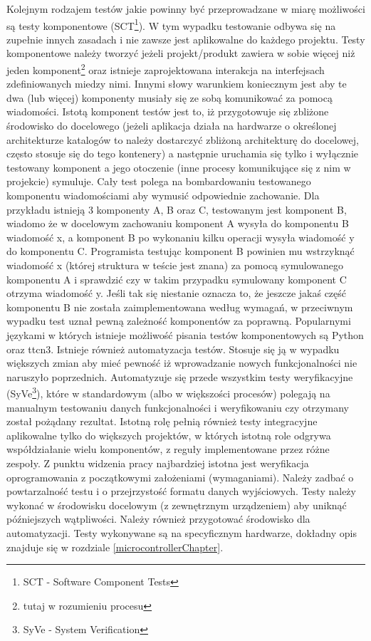 \documentclass{BscUS}
\begin{document}
\indent Kolejnym rodzajem testów jakie powinny być przeprowadzane w miarę możliwości są testy komponentowe (SCT\footnote{SCT - Software Component Tests}). W tym wypadku testowanie odbywa się na zupełnie innych zasadach i nie zawsze jest aplikowalne do każdego projektu. Testy komponentowe należy tworzyć jeżeli projekt/produkt zawiera w sobie więcej niż jeden komponent\footnote{tutaj w rozumieniu procesu} oraz istnieje zaprojektowana interakcja na interfejsach zdefiniowanych miedzy nimi. Innymi słowy warunkiem koniecznym jest aby te dwa (lub więcej) komponenty musiały się ze sobą komunikować za pomocą wiadomości. Istotą komponent testów jest to, iż przygotowuje się zbliżone środowisko do docelowego (jeżeli aplikacja działa na hardwarze o określonej architekturze katalogów to należy dostarczyć zbliżoną architekturę do docelowej, często stosuje się do tego kontenery) a następnie uruchamia się tylko i wyłącznie testowany komponent a jego otoczenie (inne procesy komunikujące się z nim w projekcie) symuluje. Cały test polega na bombardowaniu testowanego komponentu wiadomościami aby wymusić odpowiednie zachowanie. Dla przykładu istnieją 3 komponenty A, B oraz C, testowanym jest komponent B, wiadomo że w docelowym zachowaniu komponent A wysyła do komponentu B wiadomość x, a komponent B po wykonaniu kilku operacji wysyła wiadomość y do komponentu C. Programista testując komponent B powinien mu wstrzyknąć wiadomość x (której struktura w teście jest znana) za pomocą symulowanego komponentu A i sprawdzić czy w takim przypadku symulowany komponent C otrzyma wiadomość y. Jeśli tak się niestanie oznacza to, że jeszcze jakaś część komponentu B nie została zaimplementowana według wymagań, w przeciwnym wypadku test uznał pewną zależność komponentów za poprawną. Popularnymi językami w których istnieje możliwość pisania testów komponentowych są Python oraz ttcn3.
\newline
\indent Istnieje również automatyzacja testów. Stosuje się ją w wypadku większych zmian aby mieć pewność iż wprowadzanie nowych funkcjonalności nie naruszyło poprzednich. Automatyzuje się przede wszystkim testy weryfikacyjne (SyVe\footnote{SyVe - System Verification}), które w standardowym (albo w większości procesów) polegają na manualnym testowaniu danych funkcjonalności i weryfikowaniu czy otrzymany został pożądany rezultat. Istotną rolę pełnią również testy integracyjne aplikowalne tylko do większych projektów, w których istotną role odgrywa współdziałanie wielu komponentów, z reguły implementowane przez różne zespoły.
\newline
\indent Z punktu widzenia pracy najbardziej istotna jest weryfikacja oprogramowania z początkowymi założeniami (wymaganiami). Należy zadbać o powtarzalność testu i o przejrzystość formatu danych wyjściowych. Testy należy wykonać w środowisku docelowym (z zewnętrznym urządzeniem) aby uniknąć późniejszych wątpliwości. Należy również przygotować środowisko dla automatyzacji. Testy wykonywane są na specyficznym hardwarze, dokładny opis znajduje się w rozdziale \ref{microcontrollerChapter}.
\end{document}

